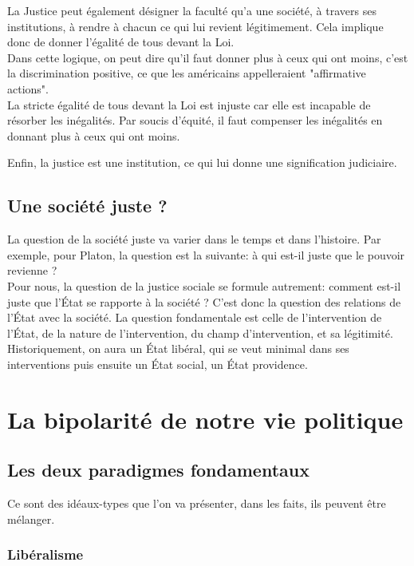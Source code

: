 \documentclass[10pt, a4paper, openany]{book}
\begin{document}
La Justice peut également désigner la faculté qu'a une société, à travers ses institutions, à rendre à chacun ce qui lui revient légitimement. Cela implique donc de donner l'égalité de tous devant la Loi. \\
Dans cette logique, on peut dire qu'il faut donner plus à ceux qui ont moins, c'est la discrimination positive, ce que les américains appelleraient "affirmative actions". \\
La stricte égalité de tous devant la Loi est injuste car elle est incapable de résorber les inégalités. Par soucis d'équité, il faut compenser les inégalités en donnant plus à ceux qui ont moins. 


Enfin, la justice est une institution, ce qui lui donne une signification judiciaire. 

\subsection{Une société juste ?}

La question de la société juste va varier dans le temps et dans l'histoire. Par exemple, pour Platon, la question est la suivante: à qui est-il juste que le pouvoir revienne ? \\
Pour nous, la question de la justice sociale se formule autrement: comment est-il juste que l'État se rapporte à la société ? C'est donc la question des relations de l'État avec la société. La question fondamentale est celle de l'intervention de l'État, de la nature de l'intervention, du champ d'intervention, et sa légitimité. \\
Historiquement, on aura un État libéral, qui se veut minimal dans ses interventions puis ensuite un État social, un État providence. 

\section{La bipolarité de notre vie politique}

\subsection{Les deux paradigmes fondamentaux}

Ce sont des idéaux-types que l'on va présenter, dans les faits, ils peuvent être mélanger. 

\subsubsection{Libéralisme}
\end{document}
